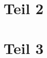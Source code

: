 \documentclass[a4paper]{article}
\title{}
\date{}
\begin{document}
    \maketitle
    
    \section{Teil 2}
    \section{Teil 3}

\end{document}
